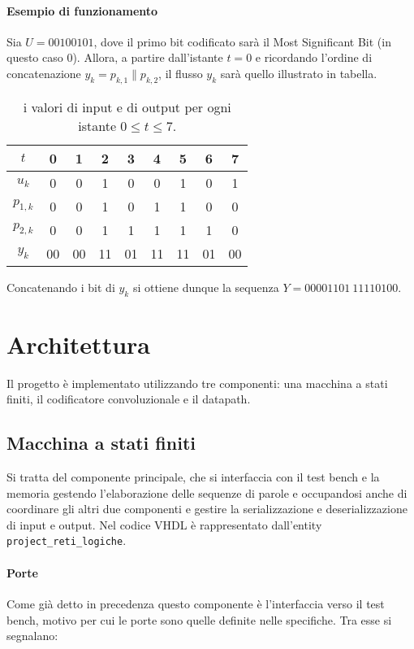 \documentclass{article}
\begin{document}
		\paragraph{Esempio di funzionamento}
		Sia $U = 00100101$, dove il primo bit codificato sarà il Most Significant Bit (in
		questo caso 0). Allora, a partire dall'istante $t = 0$ e ricordando l'ordine di
		concatenazione $y_k = p_{k,1}\|p_{k,2}$, il flusso $y_k$ sarà quello illustrato in
		tabella.

		\begin{table}[H]
			\centering
			\begin{tabular}{ c|c|c|c|c|c|c|c|c }
				$t$ & 0 & 1 & 2 & 3 & 4 & 5 & 6 & 7 \\
				\hline
				$u_k$ & 0 & 0 & 1 & 0 & 0 & 1 & 0 & 1 \\
				$p_{1,k}$ & 0 & 0 & 1 & 0 & 1 & 1 & 0 & 0 \\
				$p_{2,k}$ & 0 & 0 & 1 & 1 & 1 & 1 & 1 & 0 \\
				$y_k$ & 00 & 00 & 11 & 01 & 11 & 11 & 01 & 00
			\end{tabular}
			\caption{i valori di input e di output per ogni istante $0\le t \le 7$.}
		\end{table}

		\noindent Concatenando i bit di $y_k$ si ottiene dunque la sequenza
		$Y = 00001101\ 11110100$.

	\section{Architettura}
		Il progetto è implementato utilizzando tre componenti: una macchina a stati finiti, il
		codificatore convoluzionale e il datapath.

		\subsection{Macchina a stati finiti}
			Si tratta del componente principale, che si interfaccia con il test bench e la
			memoria gestendo l'elaborazione delle sequenze di parole e occupandosi anche di
			coordinare gli altri due componenti e gestire la serializzazione e deserializzazione
			di input e output. Nel codice VHDL è rappresentato dall'entity
			\verb|project_reti_logiche|.

			\paragraph{Porte}
			Come già detto in precedenza questo componente è l'interfaccia verso il test bench,
			motivo per cui le porte sono quelle definite nelle specifiche. Tra esse si segnalano:
\end{document}
